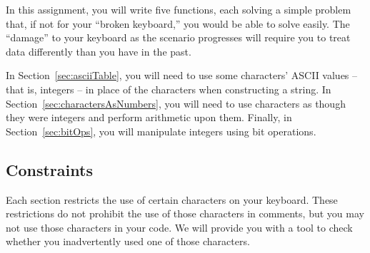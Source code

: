 In this assignment, you will write five functions, each solving a simple problem that, if not for your ``broken keyboard,'' you would be able to solve easily.
The ``damage'' to your keyboard as the scenario progresses will require you to treat data differently than you have in the past.

In Section~\ref{sec:asciiTable}, you will need to use some characters' ASCII values -- that is, integers -- in place of the characters when constructing a string.
In Section~\ref{sec:charactersAsNumbers}, you will need to use characters as though they were integers and perform arithmetic upon them.
Finally, in Section~\ref{sec:bitOps}, you will manipulate integers using bit operations.

\subsection{Constraints}

Each section restricts the use of certain characters on your keyboard.
These restrictions do not prohibit the use of those characters in comments, but you may not use those characters in  your code.
We will provide you with a tool to check whether you inadvertently used one of those characters.